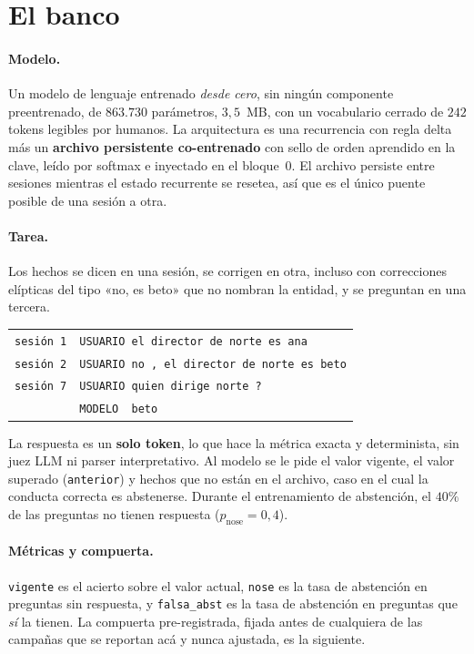 \documentclass[11pt,a4paper]{article}
\begin{document}
\section{El banco}
\label{sec:banco}

\paragraph{Modelo.} Un modelo de lenguaje entrenado \emph{desde cero}, sin ningún componente
preentrenado, de $863{.}730$ parámetros, $3{,}5$~MB, con un vocabulario cerrado de $242$ tokens
legibles por humanos. La arquitectura es una recurrencia con regla delta más un \textbf{archivo
persistente co-entrenado} con sello de orden aprendido en la clave, leído por softmax e inyectado en
el bloque~0. El archivo persiste entre sesiones mientras el estado recurrente se resetea, así que es
el único puente posible de una sesión a otra.

\paragraph{Tarea.} Los hechos se dicen en una sesión, se corrigen en otra, incluso con correcciones
elípticas del tipo «no, es beto» que no nombran la entidad, y se preguntan en una tercera.

\begin{center}
\begin{tabular}{ll}
\texttt{sesión 1} & \texttt{USUARIO\ el director de norte es ana}\\
\texttt{sesión 2} & \texttt{USUARIO\ no , el director de norte es beto}\\
\texttt{sesión 7} & \texttt{USUARIO\ quien dirige norte ?}\\
                  & \texttt{MODELO\ \ beto}\\
\end{tabular}
\end{center}

La respuesta es un \textbf{solo token}, lo que hace la métrica exacta y determinista, sin juez LLM ni
parser interpretativo. Al modelo se le pide el valor vigente, el valor superado (\texttt{anterior}) y
hechos que no están en el archivo, caso en el cual la conducta correcta es abstenerse. Durante el
entrenamiento de abstención, el $40\%$ de las preguntas no tienen respuesta
($p_{\mathrm{nose}} = 0{,}4$).

\paragraph{Métricas y compuerta.} \texttt{vigente} es el acierto sobre el valor actual,
\texttt{nose} es la tasa de abstención en preguntas sin respuesta, y \texttt{falsa\_abst} es la tasa
de abstención en preguntas que \emph{sí} la tienen. La compuerta pre-registrada, fijada antes de
cualquiera de las campañas que se reportan acá y nunca ajustada, es la siguiente.
\end{document}
